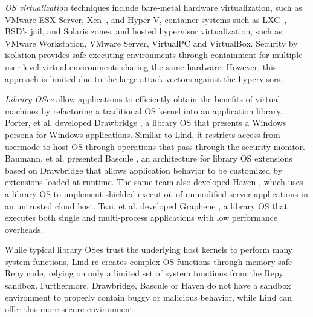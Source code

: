 \textit{OS virtualization}
techniques include
bare-metal hardware virtualization, such as VMware ESX Server, Xen~\cite{Xen-03},
and Hyper-V, container systems such as LXC~\cite{LXC}, BSD's jail, and Solaris zones, and
hosted hypervisor virtualization, such as VMware
Workstation, VMware Server, VirtualPC and VirtualBox.
Security by isolation \cite{Qubes, Overshadow, SecureVM, HypSec}
provides safe executing environments through containment for multiple
user-level virtual environments sharing the same hardware.
However, this approach is limited due to
the large attack vectors against the hypervisors.

\textit{Library OSes}
allow applications to efficiently obtain the benefits of virtual machines
by refactoring a traditional OS kernel into an application library.
Porter, et al. developed Drawbridge \cite{Drawbridge-11},
a library OS
that presents a Windows persona for %
Windows applications. Similar to Lind,
it restricts access from usermode to host OS through
operations that pass through the security monitor.
%
%
Baumann, et al. presented Bascule \cite{Bascule}, an architecture for library OS extensions
based on Drawbridge that allows application behavior to be customized by
extensions loaded at runtime. The same team also developed Haven \cite{Haven},
which uses a library OS to implement
shielded execution of unmodified server applications
in an untrusted cloud host.
Tsai, et al. developed Graphene \cite{Graphene-14}, a library OS that
executes both single and
multi-process applications with low performance overheads.

While typical library OSes trust the underlying host kernels to perform many system functions,
Lind re-creates complex OS functions through memory-safe Repy
code, relying on only a limited set of system functions from the Repy
sandbox. Furthermore, Drawbridge, Bascule or Haven
do not have a sandbox environment to properly contain
buggy or malicious behavior, while Lind can offer this more secure environment.
